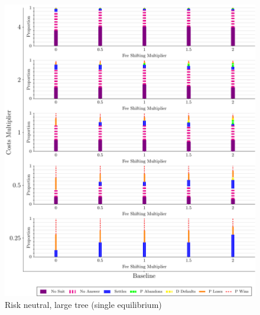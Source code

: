 \documentclass{article}
\begin{document}
\begin{figure}
    \centering
    \begin{minipage}{0.24\textwidth}
        \centering
        \includegraphics[scale=0.15, trim={0in 0in 0in 0in}, clip]{../Figures/Disposition Baseline.pdf}
		\caption{Risk neutral, large tree (single equilibrium)}
		\label{fig:treesize_panel1}
    \end{minipage}\hfill
    \begin{minipage}{0.24\textwidth}
        \centering

\end{minipage}
\end{figure}
\end{document}
